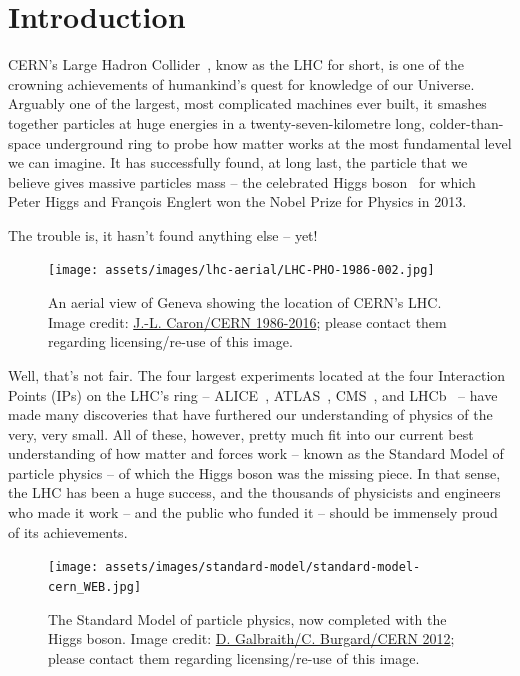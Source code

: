 \section{Introduction}
\label{sec:intro}
\acs{CERN}'s
Large Hadron Collider~\cite{LHC2008}, know as the \acs{LHC} for short,
is one of the crowning achievements of humankind's quest for knowledge of
our Universe.
%
Arguably one of the largest, most complicated machines ever built,
it smashes together particles at huge energies in a
twenty-seven-kilometre long, colder-than-space underground ring to probe
how matter works at the most fundamental level we can imagine.
It has successfully found, at long last, the particle that we believe gives
massive particles mass -- the celebrated
Higgs boson~\cite{CMS2012a,ATLAS2012c}
for which Peter Higgs
and
François Englert
won the Nobel Prize for Physics in 2013.

The trouble is, it hasn't found anything else -- yet!

%
\begin{figure}[htbp]
  \centering
  \texttt{[image: assets/images/lhc-aerial/LHC-PHO-1986-002.jpg]}
  \caption[An aerial view of Geneva showing the location of the LHC]
  {\label{fig:lsstartistimpr}An aerial view of Geneva showing the location of \acs{CERN}'s \acf{LHC}. Image credit: \href{http://cds.cern.ch/record/841527}{J.-L. Caron/CERN 1986-2016}; please contact them regarding licensing/re-use of this image.}
\end{figure}
%

Well, that's not fair. The four largest experiments located at the
four Interaction Points (IPs) on
the \ac{LHC}'s ring -- \acs{ALICE}~\cite{ALICE2008},
\acs{ATLAS}~\cite{ATLAS2008},
\acs{CMS}~\cite{CMS2008},
and
\acs{LHCb}~\cite{LHCb2008} -- have made many discoveries that have furthered
our understanding of physics of the very, very small.
%
All of these, however, pretty much fit into our current best understanding
of how matter and forces work -- known as
the Standard Model of particle physics -- of which the Higgs boson was
the missing piece.
%
In that sense, the \acs{LHC} has been a huge success,
and the thousands of physicists and engineers who made it work -- and
the public who funded it -- should be immensely proud of its achievements.

%
\begin{figure}[htbp]
  \centering
  \texttt{[image: assets/images/standard-model/standard-model-cern\_WEB.jpg]}
  \caption[The Standard Model of particle physics]
  {\label{fig:standardmodel}The Standard Model of particle physics, now %
completed with the Higgs boson. %
Image credit: \href{https://cds.cern.ch/journal/CERNBulletin/2012/35/News Articles/1473657}{D. Galbraith/C. Burgard/CERN 2012}; %
please contact them regarding licensing/re-use of this image.}
\end{figure}
%

